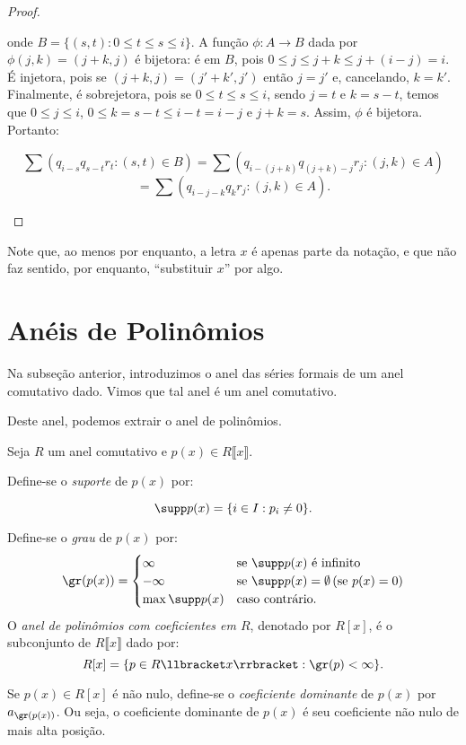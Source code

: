 \begin{proof}
\begin{itemize}
        onde $B=\{(s, t): 0\leq t\leq s\leq i\}$. A função $\phi: A\rightarrow B$ dada por $\phi(j, k)=(j+k, j)$ é bijetora: é em $B$, pois $0\leq j\leq j+k\leq j+(i-j)=i$. É injetora, pois se $(j+k, j)=(j'+k', j')$ então $j=j'$ e, cancelando, $k=k'$. Finalmente, é sobrejetora, pois se $0\leq t\leq s\leq i$, sendo $j=t$ e $k=s-t$, temos que $0\leq j\leq i$, $0\leq k=s-t\leq i-t=i-j$ e $j+k=s$. Assim, $\phi$ é bijetora. Portanto:

        $$\sum\left(q_{i-s}q_{s-t}r_t:(s, t)\in B\right)=\sum\left(q_{i-(j+k)}q_{(j+k)-j}r_j:(j, k)\in A\right)$$$$=\sum\left(q_{i-j-k}q_{k}r_j:(j, k)\in A\right).$$
    \end{itemize}
\end{proof}

Note que, ao menos por enquanto, a letra $x$ é apenas parte da notação, e que não faz sentido, por enquanto, ``substituir $x$'' por algo.
\section{Anéis de Polinômios}
Na subseção anterior, introduzimos o anel das séries formais de um anel comutativo dado. Vimos que tal anel é um anel comutativo.

Deste anel, podemos extrair o anel de polinômios.

\begin{definition}
Seja $R$ um anel comutativo e $p(x)\in R\llbracket x \rrbracket$.

Define-se o \emph{suporte} de $p(x)$ por:

\[\supp p(x) =\{i \in I: p_i\neq 0\}.\]

Define-se o \emph{grau} de $p(x)$ por:
\[
\gr(p(x))=\begin{cases}
    \infty & \text{se } \supp p(x)  \text{ é infinito}\\
    -\infty  & \text{se } \supp p(x) =\emptyset \,(\text{se } p(x)=0)\\
    \max \supp p(x)  & \text{caso contrário.}
\end{cases}
\]
O \emph{anel de polinômios com coeficientes em $R$}, denotado por $R[x]$, é o subconjunto de $R\llbracket x \rrbracket$ dado por:
$$R[x]=\{p \in R\llbracket x \rrbracket: \gr(p) < \infty\}.$$

Se $p(x)\in R[x]$ é não nulo, define-se o \emph{coeficiente dominante} de $p(x)$ por $a_{\gr(p(x))}$.
Ou seja, o coeficiente dominante de $p(x)$ é seu coeficiente não nulo de mais alta posição.
\end{definition}

